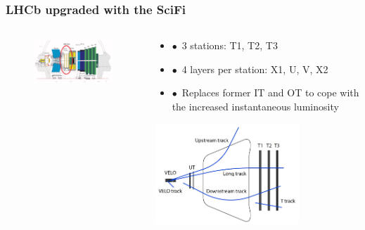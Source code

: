 \documentclass[aspectratio=1610, 12pt, xcolor=dvipsnames]{beamer}
\begin{document}
\begin{frame}\frametitle{LHCb upgraded with the SciFi}
  \begin{columns}
    \begin{column}[c]{0.48\textwidth}
      \begin{figure}
        \includegraphics[width=\textwidth]{logos/upgrade_lhcb.png}
      \end{figure}
    \end{column}
    \begin{column}{0.48\textwidth}
      \begin{itemize}
        \item $\bullet$\, 3 stations: T1, T2, T3
        \item $\bullet$\, 4 layers per station: X1, U, V, X2
      	\item $\bullet$\, Replaces former IT and OT to cope with the increased instantaneous luminosity
      \end{itemize}
      \includegraphics[width=0.7\textwidth]{track.png}
    \end{column}
  \end{columns}
\end{frame}
\end{document}
